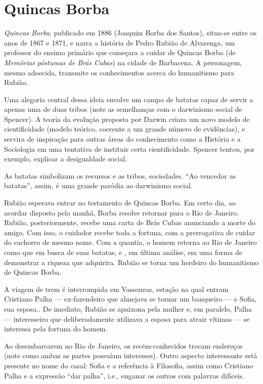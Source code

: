 
\chapter{Quincas Borba}

\textit{Quincas Borba}, publicado em 1886 (Joaquim Borba dos Santos), situa-se entre os anos de 1867 e 1871, e narra a história de Pedro Rubião de Alvarenga, um professor do ensimo primário que começara a cuidar de Quincas Borba (de \textit{Memórias póstumas de Brás Cubas}) na cidade de Barbacena. A personagem, mesmo adoecida, transmite os conhecimentos acerca do humanitismo para Rubião.

Uma alegoria central dessa ideia envolve um campo de batatas capaz de servir a apenas uma de duas tribos (note as semelhanças com o darwinismo social de Spencer). A teoria da evolução proposta por Darwin criara um novo modelo de cientificidade (modelo teórico, coerente a um grande número de evidências), e servira de inspiração para outras áreas do conhecimento como a História e a Sociologia em uma tentativa de instituir certa cientificidade. Spencer tentou, por exemplo, explicar a desigualdade social.

As batatas simbolizam os recursos e as tribos, sociedades. ``Ao vencedor as batatas'', assim, é uma grande paródia ao darwinismo social.

Rubião esperava entrar no testamento de Quincas Borba. Em certo dia, ao acordar disposto pela manhã, Borba resolve retornar para o Rio de Janeiro. Rubião, posteriormente, recebe uma carta de Brás Cubas anunciando a morte do amigo. Com isso, o cuidador recebe toda a fortuna, com a prerrogativa de cuidar do cachorro de mesmo nome. Com a quantia, o homem retorna ao Rio de Janeiro como que em busca de suas batatas, e , em última análise, em uma forma de demonstrar a riqueza que adquirira. Rubião se torna um herdeiro do humanitismo de Quincas Borba.

A viagem de trem é interrompida em Vassouras, estação na qual entram Cristiano Palha — ex-fazendeiro que almejava se tornar um banqueiro — e Sofia, sua esposa.. De imediato, Rubião se apaixona pela mulher e, em paralelo, Palha — interesseiro que deliberadamente utilizava a esposa para atrair vítimas — se interessa pela fortuna do homem.

Ao desembarcarem no Rio de Janeiro, os recém-conhecidos trocam endereços (note como ambas as partes possuíam interesses). Outro aspecto interessante está presente no nome do casal: Sofia e a referência à Filosofia, assim como Cristiano Palha e a expressão ``dar palha'', i.e., enganar os outros com palavras difíceis.

